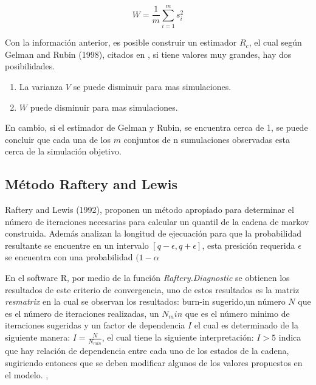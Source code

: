 \begin{equation}
W=\frac{1}{m}\sum_{i=1}^m s_i^2
\end{equation} 

Con la información anterior, es posible construir un estimador $R_c$, el cual según Gelman and Rubin (1998), citados en \cite{adlouni}, si tiene valores muy grandes, hay dos posibilidades. 

\begin{enumerate}
\item La varianza $V$ se puede disminuir para mas simulaciones. 

\item $W$ puede disminuir para mas simulaciones. 
\end{enumerate}

En cambio, si el estimador de Gelman y Rubin, se encuentra cerca de 1, se puede concluir que cada una de los $m$ conjuntos de n sumulaciones observadas esta cerca de la simulación objetivo. 


\subsection{Método Raftery and Lewis} 

Raftery and Lewis (1992), proponen un método apropiado para determinar el número de iteraciones necesarias para calcular un quantil de la cadena de markov construida. Además analizan la longitud de ejecuación para que la probabilidad resultante se encuentre en un intervalo $[q-\epsilon,q+\epsilon]$,  esta presición requerida $\epsilon$ se encuentra con una probabilidad $(1-\alpha$  \cite{Roy}

En el software R, por medio de la función \textit{Raftery.Diagnostic} se obtienen los resultados de este criterio de convergencia, uno de estos resultados es la matriz \textit{resmatrix} en la cual se observan los resultados: burn-in sugerido,un número $N$ que es el número de iteraciones realizadas, un $N_min$ que es el número minimo de iteraciones sugeridas y un factor de dependencia $I$ el cual es determinado de la siguiente manera: $I=\frac{N}{N_{min}}$, el cual tiene la siguiente interpretación: $I>5$ indica que  hay relación de dependencia entre cada uno de los estados de la cadena, sugiriendo entonces que se deben modificar algunos de los valores propuestos en el modelo. \cite{tesisbiviana}, \cite{Rdoc}